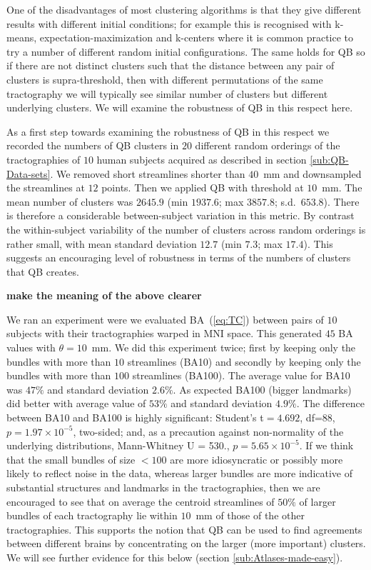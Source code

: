 \documentclass{bioinfo}
\begin{document}
One of the disadvantages of most clustering algorithms is that they give
different results with different initial conditions; for example this is
recognised with k-means, expectation-maximization
\citep{dempster1977maximum} and k-centers \citep{gonzalez1985clustering}
where it is common practice to try a number of different random initial
configurations. The same holds for QB so if there are not distinct
clusters such that the distance between any pair of clusters is
supra-threshold, then with different permutations of the same
tractography we will typically see similar number of clusters but
different underlying clusters. We will examine the robustness of QB in
this respect here.

As a first step towards examining the robustness of QB in this respect
we recorded the numbers of QB clusters in $20$ different random
orderings of the tractographies of $10$ human subjects acquired as
described in section \ref{sub:QB-Data-sets}. We removed short
streamlines shorter than $40$~mm and downsampled the streamlines at $12$
points. Then we applied QB with threshold at $10$~mm. The mean number of
clusters was $2645.9$ (min $1937.6$; max $3857.8$; s.d.~$653.8$). There
is therefore a considerable between-subject variation in this metric. By
contrast the within-subject variability of the number of clusters across
random orderings is rather small, with mean standard deviation $12.7$
(min $7.3$; max $17.4$). This suggests an encouraging level of
robustness in terms of the numbers of clusters that QB creates.

\textbf{make the meaning of the above clearer}

We ran an experiment were we evaluated BA~(\ref{eq:TC}) between pairs of
$10$ subjects with their tractographies warped in MNI space. This
generated $45$ BA values with $\theta=10$~mm. We did this experiment
twice; first by keeping only the bundles with more than $10$ streamlines
(BA10) and secondly by keeping only the bundles with more than $100$
streamlines (BA100). The average value for BA10 was $47\%$ and standard
deviation $2.6\%$. As expected BA100 (bigger landmarks) did better with
average value of $53\%$ and standard deviation $4.9\%$. The difference
between BA10 and BA100 is highly significant: Student's t$=4.692$,
df=88, $p=1.97\times10^{-5}$, two-sided; and, as a precaution against
non-normality of the underlying distributions, Mann-Whitney U = 530.,
$p=5.65\times10^{-5}$. If we think that the small bundles of size $<100$
are more idiosyncratic or possibly more likely to reflect noise in the
data, whereas larger bundles are more indicative of substantial
structures and landmarks in the tractographies, then we are encouraged
to see that on average the centroid streamlines of $50\%$ of larger
bundles of each tractography lie within $10$~mm of those of the other
tractographies. This supports the notion that QB can be used to find
agreements between different brains by concentrating on the larger (more
important) clusters. We will see further evidence for this below
(section \ref{sub:Atlases-made-easy}).
\end{document}
